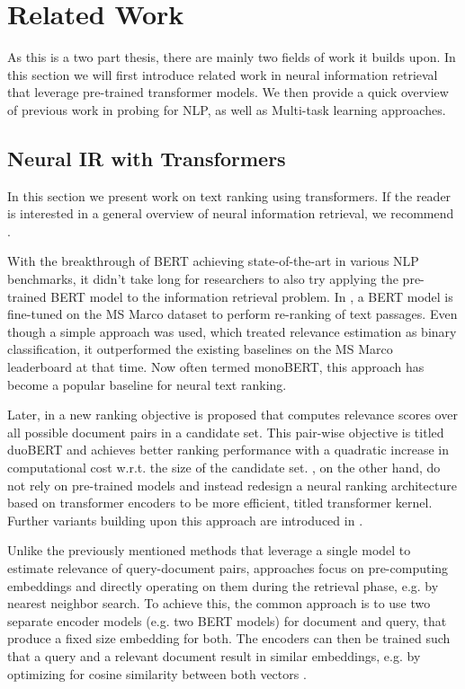 \chapter{Related Work}
\label{chap:prev}
As this is a two part thesis, there are mainly two fields of work it builds upon. In this section we will first introduce related work in neural information retrieval that leverage pre-trained transformer models. We then provide a quick overview of previous work in probing for NLP, as well as Multi-task learning approaches.

\section{Neural IR with Transformers}
In this section we present work on text ranking using transformers. If the reader is interested in a general overview of neural information retrieval, we recommend \citep{mitra2018an, Onal2017NeuralIR, Guo2020ADL}.

With the breakthrough of BERT \citep{devlin-etal-2019-bert} achieving state-of-the-art in various NLP benchmarks, it didn't take long for researchers to also try applying the pre-trained BERT model to the information retrieval problem. In \citep{Nogueira2019PassageRW}, a BERT model is fine-tuned on the MS Marco dataset \citep{DBLP:journals/corr/NguyenRSGTMD16} to perform re-ranking of text passages. Even though a simple approach was used, which treated relevance estimation as binary classification, it outperformed the existing baselines on the MS Marco leaderboard at that time. Now often termed monoBERT, this approach has become a popular baseline for neural text ranking.

Later, in \citep{Nogueira2019MultiStageDR} a new ranking objective is proposed that computes relevance scores over all possible document pairs in a candidate set. This pair-wise objective is titled duoBERT and achieves better ranking performance with a quadratic increase in computational cost w.r.t. the size of the candidate set. \citep{DBLP:journals/corr/abs-1912-01385}, on the other hand, do not rely on pre-trained models and instead redesign a neural ranking architecture based on transformer encoders to be more efficient, titled transformer kernel. Further variants building upon this approach are introduced in \citep{Hofsttter2020LocalSO, 10.1145/3404835.3463049}.

Unlike the previously mentioned methods that leverage a single model to estimate relevance of query-document pairs,  approaches focus on pre-computing embeddings and directly operating on them during the retrieval phase, e.g. by nearest neighbor search. To achieve this, the common approach is to use two separate encoder models (e.g. two BERT models) for document and query, that produce a fixed size embedding for both. The encoders can then be trained such that a query and a relevant document result in similar embeddings, e.g. by optimizing for cosine similarity between both vectors \citep{Humeau2020Poly-encoders, 10.1145/3397271.3401075, DBLP:journals/corr/abs-1908-10084}.


